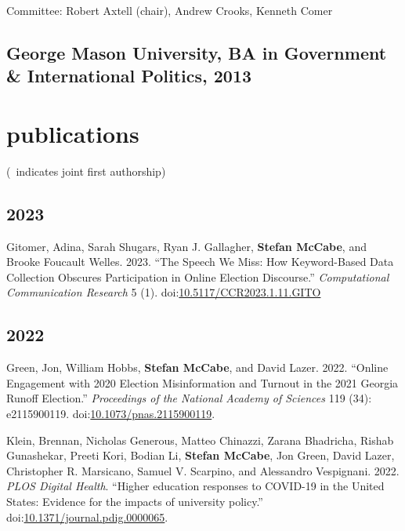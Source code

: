 \documentclass[11pt, letter]{article}
\begin{document}
Committee: Robert Axtell (chair), Andrew Crooks, Kenneth Comer
\subsection{George Mason University, BA in Government \& International Politics,
  2013}

\vspace{2mm}

\section{publications}
\vspace{1mm} {\footnotesize (\textdagger\, indicates joint first authorship)}
\subsection*{} %

\subsection{2023}
\begin{hangparas}{.25in}{1}

Gitomer, Adina, Sarah Shugars, Ryan J. Gallagher, \textbf{Stefan McCabe}, and Brooke Foucault Welles. 2023. ``The Speech We Miss: How Keyword-Based Data Collection Obscures Participation in Online Election Discourse.''  \textit{Computational Communication Research} 5 (1). doi:\href{https://doi.org/10.5117/CCR2023.1.11.GITO}{10.5117/CCR2023.1.11.GITO}\vspace{2mm}
\end{hangparas}

\subsection{2022}
\begin{hangparas}{.25in}{1}
Green, Jon, William Hobbs, \textbf{Stefan McCabe}, and David Lazer. 2022. “Online Engagement with 2020 Election Misinformation and Turnout in the 2021 Georgia Runoff Election.” \textit{Proceedings of the National Academy of Sciences} 119 (34): e2115900119. doi:\href{https://doi.org/10.1073/pnas.2115900119}{10.1073/pnas.2115900119}.
\vspace{2mm}

Klein, Brennan, Nicholas Generous, Matteo Chinazzi, Zarana Bhadricha, Rishab Gunashekar, Preeti Kori, Bodian Li, \textbf{Stefan McCabe}, Jon Green, David Lazer, Christopher R. Marsicano, Samuel V. Scarpino, and Alessandro Vespignani. 2022. \textit{PLOS Digital Health}. ``Higher education responses to COVID-19 in the United States: Evidence for the impacts of university policy.'' doi:\href{https://doi.org/10.1371/journal.pdig.0000065}{10.1371/journal.pdig.0000065}.
\vspace{2mm}
\end{hangparas}
\end{document}
